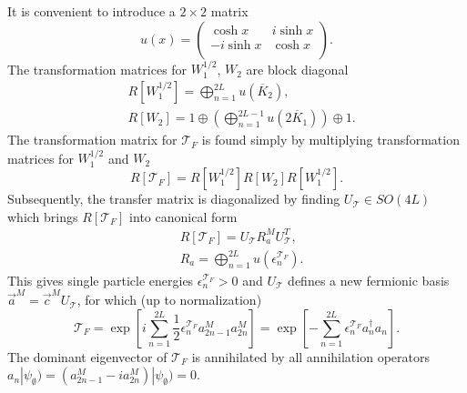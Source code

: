 \documentclass[prl,twocolumn,showpacs,floatfix,superscriptaddress,nofootinbib]{revtex4-1}
\newcommand{\Br}[1]{\left[#1\right]}
\begin{document}
It is convenient to introduce a $2\times2$ matrix
\begin{equation*}
u(x)= 
\begin{pmatrix}
\cosh  x & i \sinh  x \\
- i \sinh  x & \cosh  x \\
\end{pmatrix}.
\end{equation*}
The transformation matrices for $W_1^{1/2}$, $W_2$ are block diagonal 
\begin{eqnarray*}
 & R[W_1^{1/2}] = \bigoplus_{n=1}^{2L} u(\overline K_2), \\
 & R[W_2] = 1 \oplus \left( \bigoplus_{n=1}^{2L-1} u(2 \overline K_1) \right) \oplus 1.
 \end{eqnarray*}
The transformation matrix for $\mathcal{T}_F$ is found simply by multiplying transformation matrices for $W_1^{1/2}$ and $W_2$
\begin{equation}
\label{eq:RTF}
R[\mathcal{T}_F] = R[W_1^{1/2}] R[W_2] R[W_1^{1/2}].
\end{equation}
Subsequently, the transfer matrix is diagonalized by finding $U_\mathcal{T} \in SO(4L)$ which brings $R[\mathcal{T}_F]$ into canonical form 
\begin{eqnarray*}
& R[\mathcal{T}_F] = U_\mathcal{T} R_a^M U_\mathcal{T}^T, \\
& R_a = \bigoplus_{n=1}^{2L} u(\epsilon^{\mathcal{T}_F}_n).
\end{eqnarray*}
This gives single particle energies $\epsilon^{\mathcal{T}_F}_n>0$ and  $U_\mathcal{T}$ defines a new fermionic basis $\vec a^M = \vec c^M U_\mathcal{T}$, for which (up to normalization)
\begin{equation*}
 \mathcal{T}_F = \exp \Br{i \sum_{n=1}^{2L} \frac12 \epsilon_n^{\mathcal{T}_F} a^M_{2n-1} a^M_{2n}} = \exp \Br{-\sum_{n=1}^{2L}\epsilon_n^{\mathcal{T}_F} a_n^\dagger a_n}.
\end{equation*}
 The dominant eigenvector of $\mathcal{T}_F$ is annihilated by all annihilation operators $a_n| \psi_\emptyset ) =(a^M_{2n-1} - i a_{2n}^M) | \psi_\emptyset ) =0$.
\end{document}
